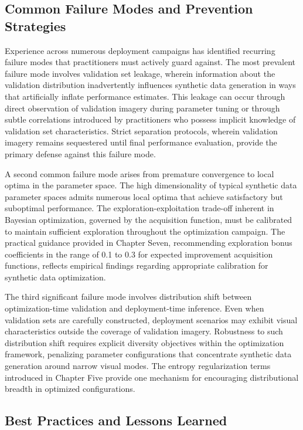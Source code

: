 \subsection{Common Failure Modes and Prevention Strategies}
\label{subsec:failure_modes}

Experience across numerous deployment campaigns has identified recurring failure modes that practitioners must actively guard against. The most prevalent failure mode involves validation set leakage, wherein information about the validation distribution inadvertently influences synthetic data generation in ways that artificially inflate performance estimates. This leakage can occur through direct observation of validation imagery during parameter tuning or through subtle correlations introduced by practitioners who possess implicit knowledge of validation set characteristics. Strict separation protocols, wherein validation imagery remains sequestered until final performance evaluation, provide the primary defense against this failure mode.

A second common failure mode arises from premature convergence to local optima in the parameter space. The high dimensionality of typical synthetic data parameter spaces admits numerous local optima that achieve satisfactory but suboptimal performance. The exploration-exploitation trade-off inherent in Bayesian optimization, governed by the acquisition function, must be calibrated to maintain sufficient exploration throughout the optimization campaign. The practical guidance provided in Chapter Seven, recommending exploration bonus coefficients in the range of 0.1 to 0.3 for expected improvement acquisition functions, reflects empirical findings regarding appropriate calibration for synthetic data optimization.

The third significant failure mode involves distribution shift between optimization-time validation and deployment-time inference. Even when validation sets are carefully constructed, deployment scenarios may exhibit visual characteristics outside the coverage of validation imagery. Robustness to such distribution shift requires explicit diversity objectives within the optimization framework, penalizing parameter configurations that concentrate synthetic data generation around narrow visual modes. The entropy regularization terms introduced in Chapter Five provide one mechanism for encouraging distributional breadth in optimized configurations.

\subsection{Best Practices and Lessons Learned}
\label{subsec:best_practices}

